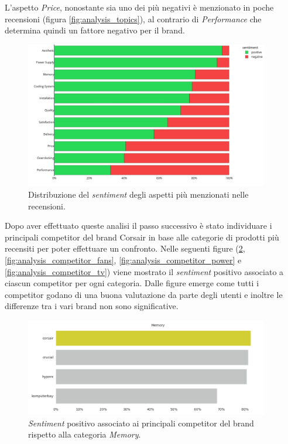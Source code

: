 L'aspetto \textit{Price}, nonostante sia uno dei più negativi è menzionato in poche recensioni (figura \ref{fig:analysis_topics}), al contrario di \textit{Performance} che determina quindi un fattore negativo per il brand.

\begin{figure}[ht]
  \centering
  \includegraphics[width=0.95\textwidth]{images/analysis/topics_sentiment.png}
  \caption{Distribuzione del \textit{sentiment} degli aspetti più menzionati nelle recensioni.}
  \label{fig:analysis_topics_sentiment}
\end{figure}

\newpage

Dopo aver effettuato queste analisi il passo successivo è stato individuare i principali competitor del brand Corsair in base alle categorie di prodotti più recensiti per poter effettuare un confronto.
Nelle seguenti figure (\ref{fig:analysis_competitor_memory}, \ref{fig:analysis_competitor_fans}, \ref{fig:analysis_competitor_power} e \ref{fig:analysis_competitor_tv}) viene mostrato il \textit{sentiment} positivo associato a ciascun competitor per ogni categoria.
Dalle figure emerge come tutti i competitor godano di una buona valutazione da parte degli utenti e inoltre le differenze tra i vari brand non sono significative.

\begin{figure}[ht]
  \centering
  \includegraphics[width=0.95\textwidth]{images/analysis/competitors_Memory.png}
  \caption{\textit{Sentiment} positivo associato ai principali competitor del brand rispetto alla categoria \textit{Memory}.}
  \label{fig:analysis_competitor_memory}
\end{figure}

